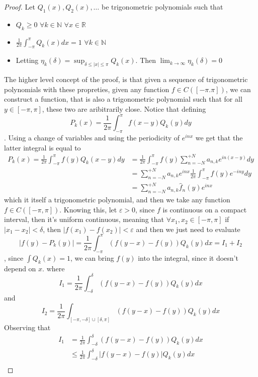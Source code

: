 \documentclass[13pt]{article}
\theoremstyle{definition}
\theoremstyle{remark}
\begin{document}
\begin{proof}
    Let $Q_1(x), Q_2(x),\ldots$ be trigonometric polynomials such that 
    \begin{itemize}
        \item $Q_k \geq 0$ $\forall k \in \mathbb{N}$ $\forall x \in \mathbb{R}$
        \item $\frac{1}{2\pi} \int_{-\pi}^\pi Q_k(x) dx = 1$ $\forall k \in \mathbb{N}$
        \item Letting $\eta_k(\delta) = \sup_{\delta \leq |x| \leq \pi} Q_k(x)$. Then $\lim_{k \to \infty} \eta_k(\delta) = 0$
    \end{itemize}
    The higher level concept of the proof, is that given a sequence of trigonometric polynomials with these propreties, given any function $f \in C([-\pi.\pi])$, we can construct a function, that is also a trigonometric polynomial such that for all $y \in [-\pi,\pi]$, these two are aribitrarily close. 
    Notice that defining
    $$ P_k(x) = \frac{1}{2\pi} \int_{-\pi}^\pi f(x-y)Q_k(y) dy$$. Using a change of variables and using the periodicity of $e^{inx}$ we get that the latter integral is equal to  
    \begin{align*}
        P_k(x) = \frac{1}{2\pi} \int_{-\pi}^{ \pi} f(y) Q_k(x-y)dy &= \frac{1}{2\pi} \int_{-\pi}^\pi f(y) \sum_{n=-N}^{+N} a_{n,k} e^{in(x-y)}dy \\
        &= \sum_{n=-N}^{+N} a_{n,k} e^{inx} \frac{1}{2\pi} \int_{-\pi}^\pi f(y)e^{-iny}dy \\
        &= \sum_{n=-N}^{+N}a_{n,k} \hat{f}_n(y) e^{inx} 
    \end{align*}
    which it itself a trigonometric polynomial, and then we take any function $f \in C([-\pi,\pi])$. Knowing this, let $\varepsilon > 0$, since $f$ is continuous on a compact interval, then it's uniform continuous, meaning that $\forall x_1,x_2 \in [-\pi,\pi]$ if $|x_1-x_2| < \delta$, then $|f(x_1) - f(x_2)| < \varepsilon$  and then we just need to evaluate 
    $$|f(y) - P_k(y)| = \frac{1}{2\pi}\int_{-\pi}^\pi (f(y-x) - f(y))Q_k(y) dx = I_1 + I_2 $$, since $\int Q_k(x) = 1$, we can bring $f(y)$ into the integral, since it doesn't depend on $x$. 
    where 
    $$I_1 = \frac{1}{2\pi} \int_{-\delta}^\delta (f(y-x) - f(y))Q_k(y)dx$$
    and 
    $$I_2 = \frac{1}{2\pi} \int_{[-\pi,-\delta]\cup[\delta,\pi]} (f(y-x) - f(y))Q_k(y)dx$$
    Observing that 
    \begin{align*}
        I_1 &= \frac{1}{2\pi} \int_{-\delta}^\delta (f(y-x) - f(y))Q_k(y)dx \\
        &\leq \frac{1}{2\pi} \int_{-\delta}^\delta |f(y-x) - f(y)|Q_k(y)dx \\

\end{align*}
\end{proof}
\end{document}
